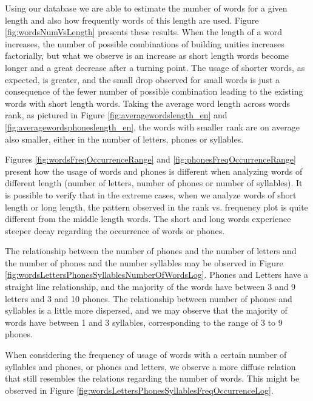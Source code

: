 Using our database we are able to estimate the number of words for a given length and
also how frequently words of this length are used. Figure \ref{fig:wordsNumVsLength} presents
these results. When the length of a word increases, the number of possible combinations of
building unities increases factorially, but what we observe is an increase as short length words
become longer and a great decrease after a turning point. The usage of shorter words, as expected,
is greater, and the small drop observed for small words is just a consequence of the fewer 
number of possible combination leading to the existing words with short length words. 
Taking the average word length across
words rank, as pictured in Figure \ref{fig:averagewordslength_en} and \ref{fig:averagewordsphoneslength_en},
the words with smaller rank are on average also smaller, either in the number of letters, phones
or syllables.

Figures \ref{fig:wordsFreqOccurrenceRange} and \ref{fig:phonesFreqOccurrenceRange}
present how the usage of words and phones is different when analyzing words of different
length (number of letters, number of phones or number of syllables).
It is possible to verify that in the extreme cases, when we analyze words of short length or 
long length, the pattern observed in the rank vs. frequency plot is quite different from the
middle length words. The short and long words experience steeper decay regarding the occurrence
of words or phones.


The relationship between the number of phones and the number of letters and 
the number of phones and the number syllables may be observed in 
Figure \ref{fig:wordsLettersPhonesSyllablesNumberOfWordsLog}.
Phones and Letters have a straight line relationship, and the majority of the words
have between 3 and 9 letters and 3 and 10 phones.
The relationship between number of phones and syllables is a little more dispersed,
and we may observe that the majority of words have between 1 and 3 syllables, corresponding
to the range of 3 to 9 phones. 

When considering the frequency of usage of words with a certain number of syllables and phones,
or phones and letters, we observe a more diffuse relation that still resembles the relations
regarding the number of words. This might be observed in 
Figure \ref{fig:wordsLettersPhonesSyllablesFreqOccurrenceLog}.

